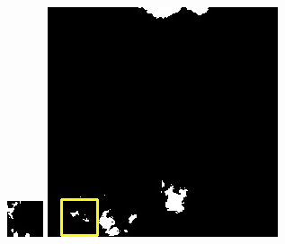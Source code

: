 \documentclass[10pt,UTF8,fntef]{ctexart}
\begin{document}
\begin{multicols}{2}
\begin{figure}[H]
{\begin{minipage}[b]{0.15\linewidth}
            \includegraphics[width=1\linewidth]{../log/spoon4/cut/tmp_cut_LC80980712014024LGN00_15440_my.jpg}\vspace{4pt}
            \includegraphics[width=1\linewidth]{../log/spoon4/cut/LC81390292014135LGN00_14081_my.jpg}\vspace{4pt}

\end{minipage}}
\end{figure}
\end{multicols}
\end{document}
